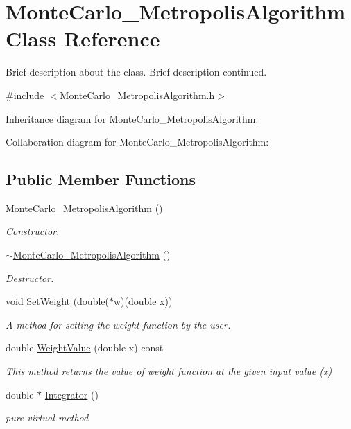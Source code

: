 \hypertarget{class_monte_carlo___metropolis_algorithm}{}\section{Monte\+Carlo\+\_\+\+Metropolis\+Algorithm Class Reference}
\label{class_monte_carlo___metropolis_algorithm}


Brief description about the class. Brief description continued.  




{\ttfamily \#include $<$Monte\+Carlo\+\_\+\+Metropolis\+Algorithm.\+h$>$}



Inheritance diagram for Monte\+Carlo\+\_\+\+Metropolis\+Algorithm\+:


Collaboration diagram for Monte\+Carlo\+\_\+\+Metropolis\+Algorithm\+:
\subsection*{Public Member Functions}
\begin{DoxyCompactItemize}
\item 
\hyperlink{class_monte_carlo___metropolis_algorithm_a80995ad029b056ca675c751c247426a5}{Monte\+Carlo\+\_\+\+Metropolis\+Algorithm} ()
\begin{DoxyCompactList}\small\item\em Constructor. \end{DoxyCompactList}\item 
\hyperlink{class_monte_carlo___metropolis_algorithm_aecedd40f8c0098bc66d455ef06814981}{$\sim$\+Monte\+Carlo\+\_\+\+Metropolis\+Algorithm} ()
\begin{DoxyCompactList}\small\item\em Destructor. \end{DoxyCompactList}\item 
void \hyperlink{class_monte_carlo___metropolis_algorithm_a46da0258439fd525ff6c93a4571c08dd}{Set\+Weight} (double($\ast$\hyperlink{main_8cpp_a6f95c347c46d0a26fc68408b470a98df}{w})(double x))
\begin{DoxyCompactList}\small\item\em A method for setting the weight function by the user. \end{DoxyCompactList}\item 
double \hyperlink{class_monte_carlo___metropolis_algorithm_a5295f6e5691292d833da48105b13ece4}{Weight\+Value} (double x) const
\begin{DoxyCompactList}\small\item\em This method returns the value of weight function at the given input value (x) \end{DoxyCompactList}\item 
double $\ast$ \hyperlink{class_monte_carlo___metropolis_algorithm_a93fba72a50330bf184156e23158992b2}{Integrator} ()
\begin{DoxyCompactList}\small\item\em pure virtual method \end{DoxyCompactList}\end{DoxyCompactItemize}


